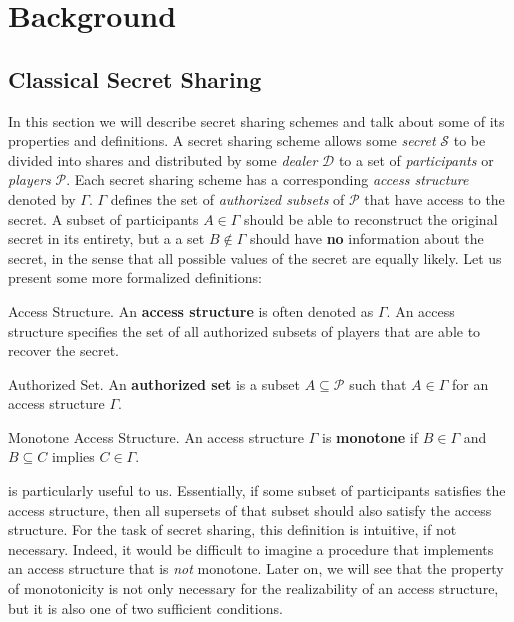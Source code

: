 \chapter{Background}
\label{ch2}

\section{Classical Secret Sharing}
\label{sec:css}

In this section we will describe secret sharing schemes and talk about some of its properties and definitions. A secret sharing scheme allows some \textit{secret} $\mathcal{S}$ to be divided into shares and distributed by some \textit{dealer} $\mathcal{D}$ to a set of \textit{participants} or \textit{players} $\mathcal{P}$. Each secret sharing scheme has a corresponding \textit{access structure} denoted by $\Gamma$. $\Gamma$ defines the set of \textit{authorized subsets} of $\mathcal{P}$ that have access to the secret. A subset of participants $A \in \Gamma$ should be able to reconstruct the original secret in its entirety, but a a set $B \notin \Gamma$ should have \textbf{no} information about the secret, in the sense that all possible values of the secret are equally likely. Let us present some more formalized definitions:

\theoremstyle{definition}
\begin{definition}{Access Structure.}
    \label{defn:access-structure}
    An \textbf{access structure} is often denoted as $\Gamma$. An access structure specifies the set of all authorized subsets of players that are able to recover the secret.
\end{definition}

\theoremstyle{definition}
\begin{definition}{Authorized Set.}
    \label{defn:authorized-set}
    An \textbf{authorized set} is a subset $A \subseteq \mathcal{P}$ such that $A \in \Gamma$ for an access structure $\Gamma$.
\end{definition}

\theoremstyle{definition}
\begin{definition}{Monotone Access Structure.}
    \label{defn:monotone}
    An access structure $\Gamma$ is \textbf{monotone} if $B \in \Gamma$ and $B \subseteq C$ implies $C \in \Gamma$.
\end{definition}

 is particularly useful to us. Essentially, if some subset of participants satisfies the access structure, then all supersets of that subset should also satisfy the access structure. For the task of secret sharing, this definition is intuitive, if not necessary. Indeed, it would be difficult to imagine a procedure that implements an access structure that is \textit{not} monotone. Later on, we will see that the property of monotonicity is not only necessary for the realizability of an access structure, but it is also one of two sufficient conditions.

